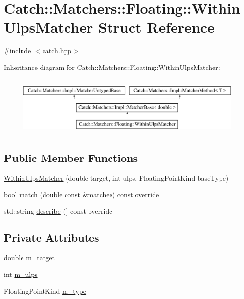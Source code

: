 \hypertarget{struct_catch_1_1_matchers_1_1_floating_1_1_within_ulps_matcher}{}\section{Catch\+::Matchers\+::Floating\+::Within\+Ulps\+Matcher Struct Reference}
\label{struct_catch_1_1_matchers_1_1_floating_1_1_within_ulps_matcher}


{\ttfamily \#include $<$catch.\+hpp$>$}

Inheritance diagram for Catch\+::Matchers\+::Floating\+::Within\+Ulps\+Matcher\+:\begin{figure}[H]
\begin{center}
\leavevmode
\includegraphics[height=2.968198cm]{struct_catch_1_1_matchers_1_1_floating_1_1_within_ulps_matcher}
\end{center}
\end{figure}
\subsection*{Public Member Functions}
\begin{DoxyCompactItemize}
\item 
\mbox{\hyperlink{struct_catch_1_1_matchers_1_1_floating_1_1_within_ulps_matcher_a836074ae4010275284ab66b2485c6575}{Within\+Ulps\+Matcher}} (double target, int ulps, Floating\+Point\+Kind base\+Type)
\item 
bool \mbox{\hyperlink{struct_catch_1_1_matchers_1_1_floating_1_1_within_ulps_matcher_aabda42a0dc5d00f3c5916feb75006b32}{match}} (double const \&matchee) const override
\item 
std\+::string \mbox{\hyperlink{struct_catch_1_1_matchers_1_1_floating_1_1_within_ulps_matcher_ad9bc8bb7f3abd326580a4bf6cf369b1b}{describe}} () const override
\end{DoxyCompactItemize}
\subsection*{Private Attributes}
\begin{DoxyCompactItemize}
\item 
double \mbox{\hyperlink{struct_catch_1_1_matchers_1_1_floating_1_1_within_ulps_matcher_a97b0112726f510af8ca22cb490c2b14d}{m\+\_\+target}}
\item 
int \mbox{\hyperlink{struct_catch_1_1_matchers_1_1_floating_1_1_within_ulps_matcher_aa117ee9be2778cdfb3ad5e66e94de1b3}{m\+\_\+ulps}}
\item 
Floating\+Point\+Kind \mbox{\hyperlink{struct_catch_1_1_matchers_1_1_floating_1_1_within_ulps_matcher_ac5dc48ae38dbfe143647d450f03771ab}{m\+\_\+type}}
\end{DoxyCompactItemize}
